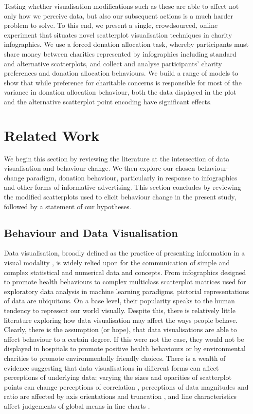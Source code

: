 \documentclass[
  authoryear,
  preprint,
  3p]{elsarticle}
\begin{document}
Testing whether visualisation modifications such as these are able to
affect not only how we perceive data, but also our subsequent actions is
a much harder problem to solve. To this end, we present a single,
crowdsourced, online experiment that situates novel scatterplot
visualisation techniques in charity infographics. We use a forced
donation allocation task, whereby participants must share money between
charities represented by infographics including standard and alternative
scatterplots, and collect and analyse participants' charity preferences
and donation allocation behaviours. We build a range of models to show
that while preference for charitable concerns is responsible for most of
the variance in donation allocation behaviour, both the data displayed
in the plot and the alternative scatterplot point encoding have
significant effects.

\section{Related Work}\label{sec-related-work}

We begin this section by reviewing the literature at the intersection of
data visualisation and behaviour change. We then explore our chosen
behaviour-change paradigm, donation behaviour, particularly in response
to infographics and other forms of informative advertising. This section
concludes by reviewing the modified scatterplots used to elicit
behaviour change in the present study, followed by a statement of our
hypotheses.

\subsection{Behaviour and Data
Visualisation}\label{sec-behaviour-data-viz}

Data visualisation, broadly defined as the practice of presenting
information in a visual modality \citep{hinterberger_2009}, is widely
relied upon for the communication of simple and complex statistical and
numerical data and concepts. From infographics designed to promote
health behaviours to complex multiclass scatterplot matrices used for
exploratory data analysis in machine learning paradigms, pictorial
representations of data are ubiquitous. On a base level, their
popularity speaks to the human tendency to represent our world visually.
Despite this, there is relatively little literature exploring how data
visualisation may affect the ways people behave. Clearly, there is the
assumption (or hope), that data visualisations are able to affect
behaviour to a certain degree. If this were not the case, they would not
be displayed in hospitals to promote positive health behaviours or by
environmental charities to promote environmentally friendly choices.
There is a wealth of evidence suggesting that data visualisations in
different forms can affect perceptions of underlying data; varying the
sizes and opacities of scatterplot points can change perceptions of
correlation \citep{strain_2023, strain_2023a, strain_2024}, perceptions
of data magnitudes and ratio are affected by axis orientations and
truncation \citep{bradley_2025, mckinley_2026}, and line characteristics
affect judgements of global means in line charts \citep{moritz_2024}.
\end{document}
